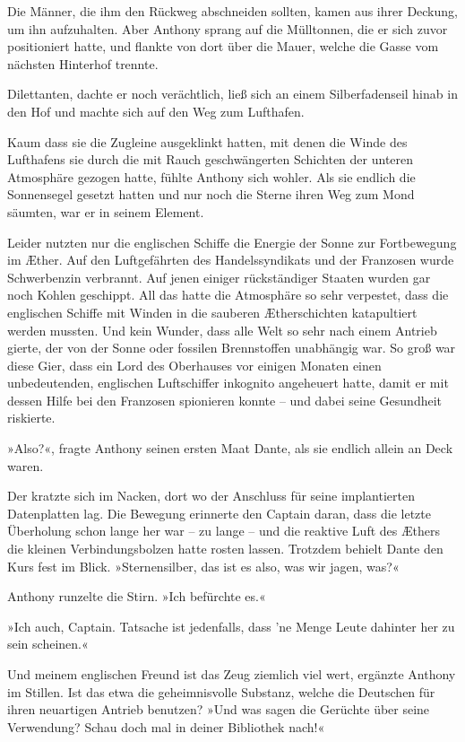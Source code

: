 Die Männer, die ihm den Rückweg abschneiden sollten, kamen aus
ihrer Deckung, um ihn aufzuhalten. Aber Anthony sprang auf die
Mülltonnen, die er sich zuvor positioniert hatte, und flankte von
dort über die Mauer, welche die Gasse vom nächsten Hinterhof
trennte.

Dilettanten, dachte er noch verächtlich, ließ sich an einem
Silberfadenseil hinab in den Hof und machte sich auf den Weg zum
Lufthafen.

\tb

Kaum dass sie die Zugleine ausgeklinkt hatten, mit denen die Winde
des Lufthafens sie durch die mit Rauch geschwängerten Schichten der
unteren Atmosphäre gezogen hatte, fühlte Anthony sich wohler. Als
sie endlich die Sonnensegel gesetzt hatten und nur noch die Sterne
ihren Weg zum Mond säumten, war er in seinem Element.

Leider nutzten nur die englischen Schiffe die Energie der Sonne zur
Fortbewegung im Æther. Auf den Luftgefährten des Handelssyndikats
und der Franzosen wurde Schwerbenzin verbrannt. Auf jenen einiger
rückständiger Staaten wurden gar noch Kohlen geschippt. All das
hatte die Atmosphäre so sehr verpestet, dass die englischen Schiffe
mit Winden in die sauberen Ætherschichten katapultiert werden
mussten. Und kein Wunder, dass alle Welt so sehr nach einem Antrieb
gierte, der von der Sonne oder fossilen Brennstoffen unabhängig
war. So groß war diese Gier, dass ein Lord des Oberhauses vor
einigen Monaten einen unbedeutenden, englischen Luftschiffer
inkognito angeheuert hatte, damit er mit dessen Hilfe bei den
Franzosen spionieren konnte – und dabei seine Gesundheit
riskierte.

»Also?«, fragte Anthony seinen ersten Maat Dante, als sie endlich
allein an Deck waren.

Der kratzte sich im Nacken, dort wo der Anschluss für seine
implantierten Datenplatten lag. Die Bewegung erinnerte den Captain
daran, dass die letzte Überholung schon lange her war – zu lange –
und die reaktive Luft des Æthers die kleinen Verbindungsbolzen
hatte rosten lassen. Trotzdem behielt Dante den Kurs fest im Blick.
»Sternensilber, das ist es also, was wir jagen, was?«

Anthony runzelte die Stirn. »Ich befürchte es.«

»Ich auch, Captain. Tatsache ist jedenfalls, dass 'ne Menge Leute
dahinter her zu sein scheinen.«

Und meinem englischen Freund ist das Zeug ziemlich viel wert,
ergänzte Anthony im Stillen. Ist das etwa die geheimnisvolle
Substanz, welche die Deutschen für ihren neuartigen Antrieb
benutzen? »Und was sagen die Gerüchte über seine Verwendung? Schau
doch mal in deiner Bibliothek nach!«

